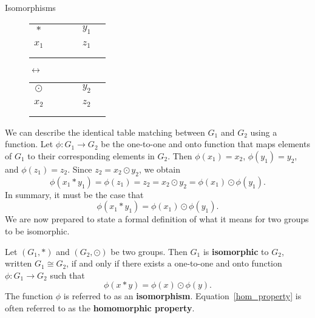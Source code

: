 \begin{section}{Isomorphisms}
\begin{figure}[!ht]
\begin{center}
\begin{tabular}{c!{\vrule width 2pt}ccc|c|c}
$*$                & & & & $y_1$  & \\ 
                   & & & &                       & \\ \hline
{}$x_1$ & & & & $z_1$ & \\ \hline
                   & & & &                      & \\
                   & & & &                      &
\end{tabular}
\hspace{1cm}
$\longleftrightarrow$
\hspace{1cm}
\begin{tabular}{c!{\vrule width 2pt}ccc|c|c}
$\odot$                & & & & $y_2$  & \\ 
                   & & & &                       & \\ \hline
{}$x_2$ & & & & $z_2$ & \\ \hline
                   & & & &                      & \\
                   & & & &                      &
\end{tabular}
\end{center}
\caption{}\label{fig:isoGroupTables}
\end{figure}

We can describe the identical table matching between $G_1$ and $G_2$ using a function.  Let $\phi:G_1\to G_2$ be the one-to-one and onto function that maps elements of $G_1$ to their corresponding elements in $G_2$.  Then $\phi(x_1)=x_2$, $\phi(y_1)=y_2$, and $\phi(z_1)=z_2$.  Since $z_2=x_2\odot y_2$, we obtain
\[
\phi(x_1*y_1)=\phi(z_1)=z_2=x_2\odot y_2=\phi(x_1)\odot \phi(y_1).
\]
In summary, it must be the case that 
\[
\phi(x_1*y_1)=\phi(x_1)\odot \phi(y_1).
\]
We are now prepared to state a formal definition of what it means for two groups to be isomorphic.

\begin{definition}\label{def:iso}
Let $(G_1,*)$ and $(G_2,\odot)$ be two groups.  Then $G_1$ is \textbf{isomorphic} to $G_2$, written $G_1\cong G_2$, if and only if there exists a one-to-one and onto function $\phi:G_1\to G_2$ such that
\begin{equation}\label{hom_property}
\phi(x*y)=\phi(x)\odot \phi(y).
\end{equation}
The function $\phi$ is referred to as an \textbf{isomorphism}.  Equation~\ref{hom_property} is often referred to as the \textbf{homomorphic property}.
\end{definition}


\end{section}

